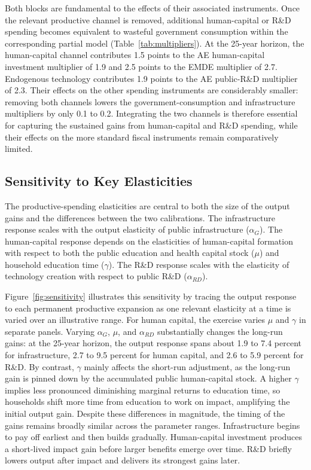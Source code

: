 \documentclass[a4paper,11pt]{article}
\begin{document}
Both blocks are fundamental to the effects of their associated instruments.
Once the relevant productive channel is removed, additional human-capital or R\&D spending becomes equivalent to wasteful government consumption within the corresponding partial model (Table~\ref{tab:multipliers}).
At the 25-year horizon, the human-capital channel contributes 1.5 points to the AE human-capital investment multiplier of 1.9 and 2.5 points to the EMDE multiplier of 2.7.
Endogenous technology contributes 1.9 points to the AE public-R\&D multiplier of 2.3.
Their effects on the other spending instruments are considerably smaller: removing both channels lowers the government-consumption and infrastructure multipliers by only 0.1 to 0.2.
Integrating the two channels is therefore essential for capturing the sustained gains from human-capital and R\&D spending, while their effects on the more standard fiscal instruments remain comparatively limited.

\subsection{Sensitivity to Key Elasticities} \label{subsec:sensitivity}

The productive-spending elasticities are central to both the size of the output gains and the differences between the two calibrations.
The infrastructure response scales with the output elasticity of public infrastructure ($\alpha_G$).
The human-capital response depends on the elasticities of human-capital formation with respect to both the public education and health capital stock ($\mu$) and household education time ($\gamma$).
The R\&D response scales with the elasticity of technology creation with respect to public R\&D ($\alpha_{RD}$).

Figure~\ref{fig:sensitivity} illustrates this sensitivity by tracing the output response to each permanent productive expansion as one relevant elasticity at a time is varied over an illustrative range.
For human capital, the exercise varies $\mu$ and $\gamma$ in separate panels.
Varying $\alpha_G$, $\mu$, and $\alpha_{RD}$ substantially changes the long-run gains: at the 25-year horizon, the output response spans about 1.9 to 7.4 percent for infrastructure, 2.7 to 9.5 percent for human capital, and 2.6 to 5.9 percent for R\&D.
By contrast, $\gamma$ mainly affects the short-run adjustment, as the long-run gain is pinned down by the accumulated public human-capital stock.
A higher $\gamma$ implies less pronounced diminishing marginal returns to education time, so households shift more time from education to work on impact, amplifying the initial output gain.
Despite these differences in magnitude, the timing of the gains remains broadly similar across the parameter ranges.
Infrastructure begins to pay off earliest and then builds gradually.
Human-capital investment produces a short-lived impact gain before larger benefits emerge over time.
R\&D briefly lowers output after impact and delivers its strongest gains later.
\end{document}
